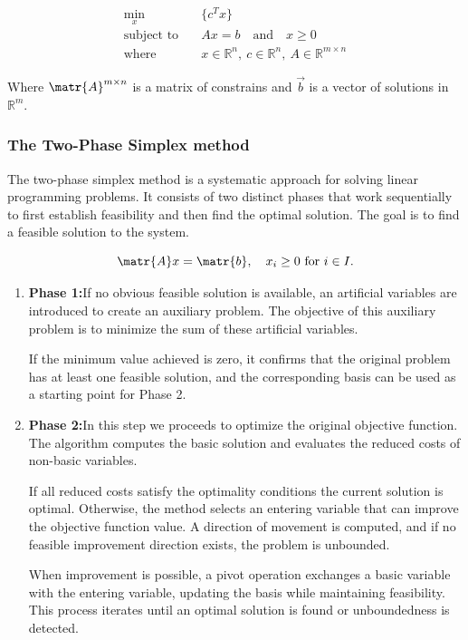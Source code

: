 \begin{equation*}
\begin{split}
    \min_{x}\ & \{c^Tx\} \\
    \text{subject to}\quad & Ax = b \quad \text{and} \quad x \geq 0 \\
    \text{where}\quad & x \in \mathbb{R}^n, \ c \in \mathbb{R}^n, \ A \in \mathbb{R}^{m \times n}
\end{split}
\end{equation*}

Where $\matr{A}^{m\times n}$ is a matrix of constrains and $\Vec{b}$ is a vector of solutions in $\mathbb{R}^m$.

\subsubsection*{The Two-Phase Simplex method}

The two-phase simplex method is a systematic approach for solving linear programming problems. It consists of two distinct phases that work sequentially to first establish feasibility and then find the optimal solution.
The goal is to find a feasible solution to the system.

\begin{equation*}
    \matr{A}x=\matr{b},\quad x_i \geq 0 \text{ for } i \in I.
\end{equation*}
\begin{enumerate}
    \item \textbf{Phase 1:}If no obvious feasible solution is available, an artificial variables are introduced to create an auxiliary problem.
    The objective of this auxiliary problem is to minimize the sum of these artificial variables.

    If the minimum value achieved is zero, it confirms that the original problem has at least one feasible solution, and the corresponding basis can be used as a starting point for Phase 2.

    \item \textbf{Phase 2:}In this step we proceeds to optimize the original objective function. The algorithm computes the basic solution and evaluates the reduced costs of non-basic variables.

    If all reduced costs satisfy the optimality conditions the current solution is optimal. Otherwise, the method selects an entering variable that can improve the objective function value. A direction of movement is computed, and if no feasible improvement direction exists, the problem is unbounded.

    When improvement is possible, a pivot operation exchanges a basic variable with the entering variable, updating the basis while maintaining feasibility. This process iterates until an optimal solution is found or unboundedness is detected.
\end{enumerate}

